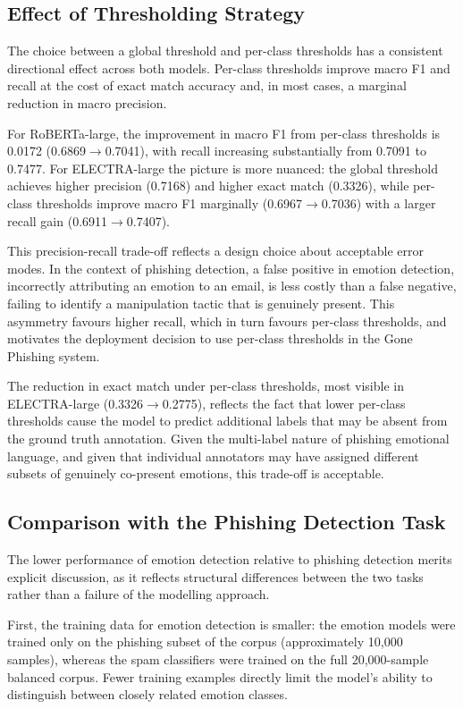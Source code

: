 \subsection{Effect of Thresholding Strategy}

The choice between a global threshold and per-class thresholds has a consistent directional effect across both models. Per-class thresholds improve macro F1 and recall at the cost of exact match accuracy and, in most cases, a marginal reduction in macro precision.

For \acs{RoBERTa}-large, the improvement in macro F1 from per-class thresholds is 0.0172 (0.6869$\to$0.7041), with recall increasing substantially from 0.7091 to 0.7477. For \acs{ELECTRA}-large the picture is more nuanced: the global threshold achieves higher precision (0.7168) and higher exact match (0.3326), while per-class thresholds improve macro F1 marginally (0.6967$\to$0.7036) with a larger recall gain (0.6911$\to$0.7407).

This precision-recall trade-off reflects a design choice about acceptable error modes. In the context of phishing detection, a false positive in emotion detection, incorrectly attributing an emotion to an email, is less costly than a false negative, failing to identify a manipulation tactic that is genuinely present. This asymmetry favours higher recall, which in turn favours per-class thresholds, and motivates the deployment decision to use per-class thresholds in the Gone Phishing system.

The reduction in exact match under per-class thresholds, most visible in \acs{ELECTRA}-large (0.3326$\to$0.2775), reflects the fact that lower per-class thresholds cause the model to predict additional labels that may be absent from the ground truth annotation. Given the multi-label nature of phishing emotional language, and given that individual annotators may have assigned different subsets of genuinely co-present emotions, this trade-off is acceptable.

\subsection{Comparison with the Phishing Detection Task}

The lower performance of emotion detection relative to phishing detection merits explicit discussion, as it reflects structural differences between the two tasks rather than a failure of the modelling approach.

First, the training data for emotion detection is smaller: the emotion models were trained only on the phishing subset of the corpus (approximately 10,000 samples), whereas the spam classifiers were trained on the full 20,000-sample balanced corpus. Fewer training examples directly limit the model's ability to distinguish between closely related emotion classes.

